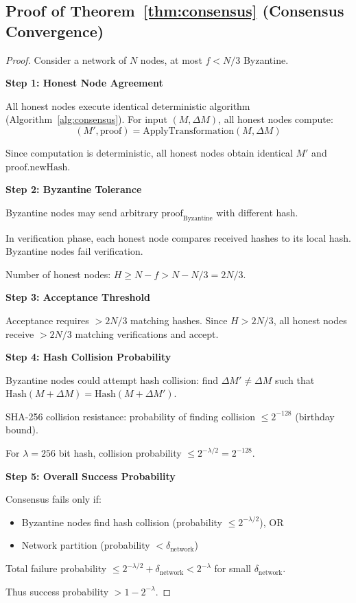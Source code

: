 \documentclass[11pt,a4paper]{article}
\theoremstyle{definition}
\theoremstyle{remark}
\begin{document}
\subsection{Proof of Theorem~\ref{thm:consensus} (Consensus Convergence)}

\begin{proof}
Consider a network of $N$ nodes, at most $f < N/3$ Byzantine.

\textbf{Step 1: Honest Node Agreement}

All honest nodes execute identical deterministic algorithm (Algorithm~\ref{alg:consensus}). For input $(M, \Delta M)$, all honest nodes compute:
\begin{equation}
(M', \text{proof}) = \text{ApplyTransformation}(M, \Delta M)
\end{equation}

Since computation is deterministic, all honest nodes obtain identical $M'$ and $\text{proof.newHash}$.

\textbf{Step 2: Byzantine Tolerance}

Byzantine nodes may send arbitrary $\text{proof}_{\text{Byzantine}}$ with different hash.

In verification phase, each honest node compares received hashes to its local hash. Byzantine nodes fail verification.

Number of honest nodes: $H \geq N - f > N - N/3 = 2N/3$.

\textbf{Step 3: Acceptance Threshold}

Acceptance requires $> 2N/3$ matching hashes. Since $H > 2N/3$, all honest nodes receive $> 2N/3$ matching verifications and accept.

\textbf{Step 4: Hash Collision Probability}

Byzantine nodes could attempt hash collision: find $\Delta M' \neq \Delta M$ such that $\text{Hash}(M + \Delta M) = \text{Hash}(M + \Delta M')$.

SHA-256 collision resistance: probability of finding collision $\leq 2^{-128}$ (birthday bound).

For $\lambda = 256$ bit hash, collision probability $\leq 2^{-\lambda/2} = 2^{-128}$.

\textbf{Step 5: Overall Success Probability}

Consensus fails only if:
\begin{itemize}
\item Byzantine nodes find hash collision (probability $\leq 2^{-\lambda/2}$), OR
\item Network partition (probability $< \delta_{\text{network}}$)
\end{itemize}

Total failure probability $\leq 2^{-\lambda/2} + \delta_{\text{network}} < 2^{-\lambda}$ for small $\delta_{\text{network}}$.

Thus success probability $> 1 - 2^{-\lambda}$.
\end{proof}
\end{document}
